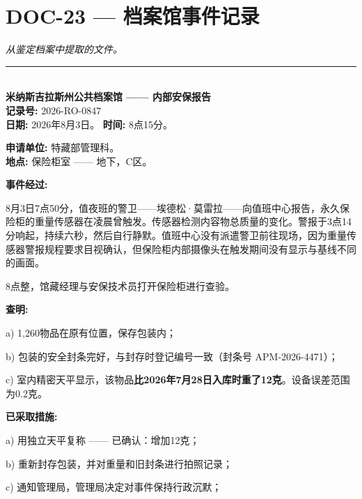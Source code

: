 \section*{\textbf{DOC-23} --- 档案馆事件记录}

\noindent \textit{从鉴定档案中提取的文件。}

\vspace{0.5em}\noindent\rule{\textwidth}{0.5pt}\vspace{0.5em}


\\[-0.2em]

\noindent \textbf{米纳斯吉拉斯州公共档案馆 —— 内部安保报告}\\
\noindent \textbf{记录号:} 2026-RO-0847\\
\noindent\textbf{日期:} 2026年8月3日。 \textbf{时间:} 8点15分。

\noindent \textbf{申请单位:} 特藏部管理科。\\
\noindent \textbf{地点:} 保险柜室 —— 地下，C区。

\noindent \textbf{事件经过:}

\noindent 8月3日7点50分，值夜班的警卫——埃德松·莫雷拉——向值班中心报告，永久保险柜的重量传感器在凌晨曾触发。传感器检测内容物总质量的变化。警报于3点14分响起，持续六秒，然后自行静默。值班中心没有派遣警卫前往现场，因为重量传感器警报规程要求目视确认，但保险柜内部摄像头在触发期间没有显示与基线不同的画面。

\noindent 8点整，馆藏经理与安保技术员打开保险柜进行查验。

\noindent \textbf{查明:}

\noindent a) 1,260物品在原有位置，保存包装内；

\noindent b) 包装的安全封条完好，与封存时登记编号一致（封条号 APM-2026-4471）；

\noindent c) 室内精密天平显示，该物品\textbf{比2026年7月28日入库时重了12克}。设备误差范围为0.2克。

\noindent \textbf{已采取措施:}

\noindent a) 用独立天平复称 —— 已确认：增加12克；

\noindent b) 重新封存包装，并对重量和旧封条进行拍照记录；

\noindent c) 通知管理局，管理局决定对事件保持行政沉默；

